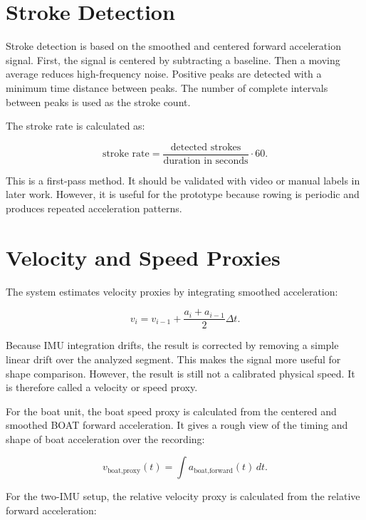 \section{Stroke Detection}

Stroke detection is based on the smoothed and centered forward acceleration signal. First, the signal is centered by subtracting a baseline. Then a moving average reduces high-frequency noise. Positive peaks are detected with a minimum time distance between peaks. The number of complete intervals between peaks is used as the stroke count.

The stroke rate is calculated as:

\begin{equation}
  \text{stroke rate} =
  \frac{\text{detected strokes}}{\text{duration in seconds}} \cdot 60.
\end{equation}

This is a first-pass method. It should be validated with video or manual labels in later work. However, it is useful for the prototype because rowing is periodic and produces repeated acceleration patterns.

\section{Velocity and Speed Proxies}

The system estimates velocity proxies by integrating smoothed acceleration:

\begin{equation}
  v_i = v_{i-1} +
  \frac{a_i + a_{i-1}}{2}\Delta t.
\end{equation}

Because IMU integration drifts, the result is corrected by removing a simple linear drift over the analyzed segment. This makes the signal more useful for shape comparison. However, the result is still not a calibrated physical speed. It is therefore called a velocity or speed proxy.

For the boat unit, the boat speed proxy is calculated from the centered and smoothed BOAT forward acceleration. It gives a rough view of the timing and shape of boat acceleration over the recording:

\begin{equation}
  v_{\text{boat,proxy}}(t)
  = \int a_{\text{boat,forward}}(t)\,dt.
\end{equation}

For the two-IMU setup, the relative velocity proxy is calculated from the relative forward acceleration:


